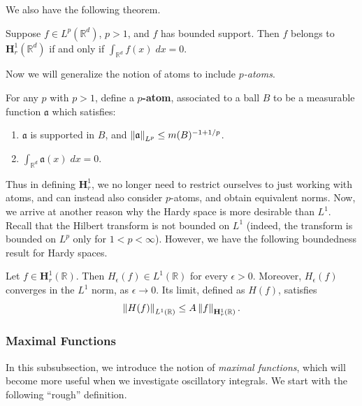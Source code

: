 \documentclass{article}
\begin{document}
We also have the following theorem. 
\begin{prop}
	Suppose $f \in L^{p}(\mathbb{R}^{d})$, $p > 1$, and $f$ has bounded support. Then $f$ belongs to $\mathbf{H}^{1}_{r}(\mathbb{R}^{d})$ if and only if $\int_{\mathbb{R}^{d}}f(x)\;dx = 0$. 
\end{prop} 

Now we will generalize the notion of atoms to include \textit{$p$-atoms}. 
\begin{definition}[$p$-Atoms]
	For any $p$ with $p >1$, define a \textbf{$p$-atom}, associated to a ball $B$ to be a measurable function $\mathfrak{a}$ which satisfies: \vspace{-0.35cm} 
	\begin{enumerate}[itemsep =-2pt,label = (\roman{*})]
		\item $\mathfrak{a}$ is supported in $B$, and $\left\Vert \mathfrak{a} \right\Vert_{L^{p}} \leq m(B)^{-1 + 1/p}$. 
		\item $\int_{\mathbb{R}^{d}}\mathfrak{a}(x)\;dx = 0$. 
	\end{enumerate}
\end{definition}
Thus in defining $\mathbf{H}^{1}_{r}$, we no longer need to restrict ourselves to just working with atoms, and can instead also consider $p$-atoms, and obtain equivalent norms. Now, we arrive at another reason why the Hardy space is more desirable than $L^{1}$. Recall that the Hilbert transform is not bounded on $L^{1}$ (indeed, the transform is bounded on $L^{p}$ only for $1 < p < \infty$). However, we have the following boundedness result for Hardy spaces. 
\begin{theorem}
	Let $f \in \mathbf{H}^{1}_{r}(\mathbb{R})$. Then $H_{\epsilon}(f) \in L^{1}(\mathbb{R})$ for every $\epsilon > 0$. Moreover, $H_{\epsilon}(f)$ converges in the $L^{1}$ norm, as $\epsilon \to 0$. Its limit, defined as $H(f)$, satisfies 
	\begin{equation*}
		\left\Vert H(f) \right\Vert_{L^{1}(\mathbb{R})} \leq A \left\Vert f \right\Vert_{\mathbf{H}^{1}_{r}(\mathbb{R})}. 
	\end{equation*}
\end{theorem} 

\subsubsection{Maximal Functions} 
In this subsubsection, we introduce the notion of \textit{maximal functions}, which will become more useful when we investigate oscillatory integrals. We start with the following ``rough'' definition. 
\end{document}
